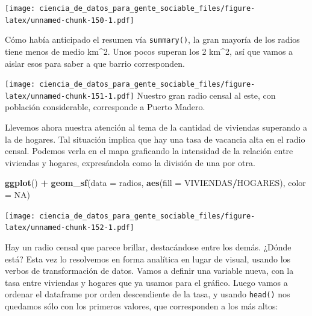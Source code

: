\documentclass[]{book}
\newenvironment{Shaded}{\begin{snugshade}}{\end{snugshade}}
\newcommand{\KeywordTok}[1]{\textcolor[rgb]{0.13,0.29,0.53}{\textbf{#1}}}
\newcommand{\DataTypeTok}[1]{\textcolor[rgb]{0.13,0.29,0.53}{#1}}
\newcommand{\DecValTok}[1]{\textcolor[rgb]{0.00,0.00,0.81}{#1}}
\newcommand{\StringTok}[1]{\textcolor[rgb]{0.31,0.60,0.02}{#1}}
\newcommand{\OtherTok}[1]{\textcolor[rgb]{0.56,0.35,0.01}{#1}}
\newcommand{\OperatorTok}[1]{\textcolor[rgb]{0.81,0.36,0.00}{\textbf{#1}}}
\newcommand{\NormalTok}[1]{#1}
\begin{document}
\texttt{[image: ciencia\_de\_datos\_para\_gente\_sociable\_files/figure-latex/unnamed-chunk-150-1.pdf]}

Cómo había anticipado el resumen vía \texttt{summary()}, la gran mayoría
de los radios tiene menos de medio km\^{}2. Unos pocos superan los 2
km\^{}2, así que vamos a aislar esos para saber a que barrio
corresponden.

\begin{Shaded}
\end{Shaded}

\texttt{[image: ciencia\_de\_datos\_para\_gente\_sociable\_files/figure-latex/unnamed-chunk-151-1.pdf]}
Nuestro gran radio censal al este, con población considerable,
corresponde a Puerto Madero.

Llevemos ahora nuestra atención al tema de la cantidad de viviendas
superando a la de hogares. Tal situación implica que hay una tasa de
vacancia alta en el radio censal. Podemos verla en el mapa graficando la
intensidad de la relación entre viviendas y hogares, expresándola como
la división de una por otra.

\begin{Shaded}
\begin{Highlighting}[]
\KeywordTok{ggplot}\NormalTok{() }\OperatorTok{+}\StringTok{ }\KeywordTok{geom_sf}\NormalTok{(}\DataTypeTok{data =}\NormalTok{ radios, }\KeywordTok{aes}\NormalTok{(}\DataTypeTok{fill =}\NormalTok{ VIVIENDAS}\OperatorTok{/}\NormalTok{HOGARES), }\DataTypeTok{color =} \OtherTok{NA}\NormalTok{)}
\end{Highlighting}
\end{Shaded}

\texttt{[image: ciencia\_de\_datos\_para\_gente\_sociable\_files/figure-latex/unnamed-chunk-152-1.pdf]}

Hay un radio censal que parece brillar, destacándose entre los demás.
¿Dónde está? Esta vez lo resolvemos en forma analítica en lugar de
visual, usando los verbos de transformación de datos. Vamos a definir
una variable nueva, con la tasa entre viviendas y hogares que ya usamos
para el gráfico. Luego vamos a ordenar el dataframe por orden
descendiente de la tasa, y usando \texttt{head()} nos quedamos sólo con
los primeros valores, que corresponden a los más altos:
\end{document}
